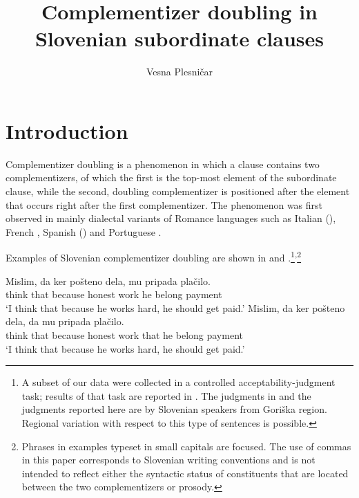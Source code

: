 \documentclass[output=paper,
]{langscibook}
\author{Vesna Plesničar\affiliation{University of Nova Gorica}}
\title{Complementizer doubling in Slovenian subordinate clauses}
\begin{document}
\maketitle

\section{Introduction} 
Complementizer doubling is a phenomenon in which a clause contains two complementizers, of which the first is the top-most element of the subordinate clause, while the second, doubling complementizer is positioned after the element that occurs right after the first complementizer. The phenomenon was first observed in mainly dialectal variants of Romance languages such as Italian (\citealt{Paoli2003, ledgeway2005, munaro2016}), French \citep{dagnac2012}, Spanish (\citealt{villa2012, GiP2014}) and Portuguese \citep{mascarenhas2007}.

Examples of Slovenian complementizer doubling are shown in  and .\footnote{A subset of our data were collected in a controlled acceptability-judgment task; results of that task are reported in \cite{plesnicar2016}. The judgments in \cite{plesnicar2016} and the judgments reported here are by Slovenian speakers from Goriška region. Regional variation with respect to this type of sentences is possible.}\textsuperscript{,}\footnote{Phrases in examples typeset in small capitals are focused. The use of commas in this paper corresponds to Slovenian writing conventions and is not intended to reflect either the syntactic status of constituents that are located between the two complementizers or prosody.}


\begin{exe}
\ex \begin{xlist}\label{ex:plesnicar:1}
\ex \label{ex:plesnicar:onea}\gll Mislim,	da	ker		pošteno	dela, 	mu	pripada plačilo.\\
	think that because	honest		work	he	belong payment \\
\trans `I think that because he works hard, he should get paid.'
\ex \label{ex:plesnicar:oneb}
\gll	Mislim,	da	ker		pošteno	dela,	da	mu 	pripada plačilo. \\
	think that	because	honest	work	that	he	belong payment \\
\trans `I think that because he works hard, he should get paid.'
\end{xlist}\end{exe}
\end{document}
